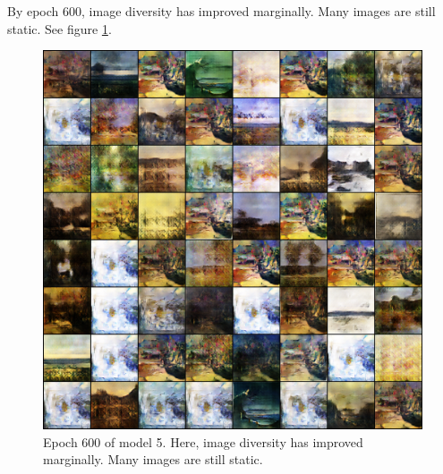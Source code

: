 \documentclass[11pt,letterpaper]{article}
\begin{document}
				By epoch 600, image diversity has improved marginally.
				Many images are still static.
				See figure \ref{fig:wa128:epoch600generator}.
				\begin{figure}
					\centering
					\includegraphics[width=1.0\linewidth]{results/model5/epoch600_generator}
					\caption{Epoch 600 of model 5. Here, image diversity has improved marginally. Many images are still static.}
					\label{fig:wa128:epoch600generator}
				\end{figure}
\end{document}
